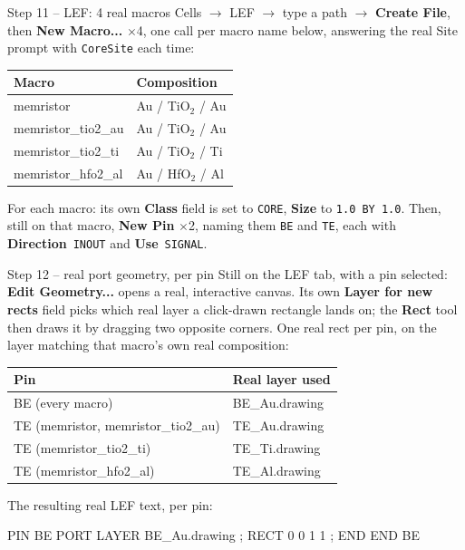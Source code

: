 \documentclass[aspectratio=169]{beamer}
\begin{document}
\begin{frame}[fragile]{Step 11 -- LEF: 4 real macros}
Cells $\to$ LEF $\to$ type a path $\to$ \textbf{Create File}, then
\textbf{New Macro...} $\times$4, one call per macro name below,
answering the real Site prompt with \texttt{CoreSite} each time:
\begin{center}
\begin{tabularx}{\textwidth}{lX}
\toprule
Macro & Composition \\
\midrule
memristor & Au / TiO$_2$ / Au \\
memristor\_tio2\_au & Au / TiO$_2$ / Au \\
memristor\_tio2\_ti & Au / TiO$_2$ / Ti \\
memristor\_hfo2\_al & Au / HfO$_2$ / Al \\
\bottomrule
\end{tabularx}
\end{center}
\footnotesize
For each macro: its own \textbf{Class} field is set to \texttt{CORE},
\textbf{Size} to \texttt{1.0 BY 1.0}. Then, still on that macro,
\textbf{New Pin} $\times$2, naming them \texttt{BE} and \texttt{TE},
each with \textbf{Direction}~\texttt{INOUT} and \textbf{Use}~\texttt{SIGNAL}.
\end{frame}

\begin{frame}[fragile]{Step 12 -- real port geometry, per pin}
\footnotesize
Still on the LEF tab, with a pin selected: \textbf{Edit Geometry...}
opens a real, interactive canvas. Its own \textbf{Layer for new
rects} field picks which real layer a click-drawn rectangle lands
on; the \textbf{Rect} tool then draws it by dragging two opposite
corners. One real rect per pin, on the layer matching that macro's
own real composition:
\begin{center}
\begin{tabularx}{\textwidth}{lX}
\toprule
Pin & Real layer used \\
\midrule
BE (every macro) & BE\_Au.drawing \\
TE (memristor, memristor\_tio2\_au) & TE\_Au.drawing \\
TE (memristor\_tio2\_ti) & TE\_Ti.drawing \\
TE (memristor\_hfo2\_al) & TE\_Al.drawing \\
\bottomrule
\end{tabularx}
\end{center}
The resulting real LEF text, per pin:
\begin{va}
PIN BE
  PORT LAYER BE_Au.drawing ; RECT 0 0 1 1 ; END
END BE
\end{va}
\end{frame}
\end{document}
